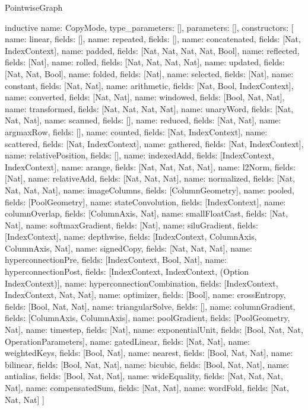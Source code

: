 \begin{lexlean}{PointwiseGraph}
\begin{semanticmodule}
inductive{
  name: CopyMode,
  type_parameters: [],
  parameters: [],
  constructors: [
    {name: linear, fields: []},
    {name: repeated, fields: []},
    {name: concatenated, fields: [Nat, IndexContext]},
    {name: padded, fields: [Nat, Nat, Nat, Nat, Bool]},
    {name: reflected, fields: [Nat]},
    {name: rolled, fields: [Nat, Nat, Nat, Nat]},
    {name: updated, fields: [Nat, Nat, Bool]},
    {name: folded, fields: [Nat]},
    {name: selected, fields: [Nat]},
    {name: constant, fields: [Nat, Nat]},
    {name: arithmetic, fields: [Nat, Bool, IndexContext]},
    {name: converted, fields: [Nat, Nat]},
    {name: windowed, fields: [Bool, Nat, Nat]},
    {name: transformed, fields: [Nat, Nat, Nat, Nat]},
    {name: unaryWord, fields: [Nat, Nat, Nat]},
    {name: scanned, fields: []},
    {name: reduced, fields: [Nat, Nat]},
    {name: argmaxRow, fields: []},
    {name: counted, fields: [Nat, IndexContext]},
    {name: scattered, fields: [Nat, IndexContext]},
    {name: gathered, fields: [Nat, IndexContext]},
    {name: relativePosition, fields: []},
    {name: indexedAdd, fields: [IndexContext, IndexContext]},
    {name: arange, fields: [Nat, Nat, Nat, Nat]},
    {name: l2Norm, fields: [Nat]},
    {name: relativeAdd, fields: [Nat, Nat, Nat]},
    {name: normalized, fields: [Nat, Nat, Nat, Nat]},
    {name: imageColumns, fields: [ColumnGeometry]},
    {name: pooled, fields: [PoolGeometry]},
    {name: stateConvolution, fields: [IndexContext]},
    {name: columnOverlap, fields: [ColumnAxis, Nat]},
    {name: smallFloatCast, fields: [Nat, Nat]},
    {name: softmaxGradient, fields: [Nat]},
    {name: siluGradient, fields: [IndexContext]},
    {name: depthwise, fields: [IndexContext, ColumnAxis, ColumnAxis, Nat]},
    {name: signedCopy, fields: [Nat, Nat, Nat]},
    {name: hyperconnectionPre, fields: [IndexContext, Bool, Nat]},
    {name: hyperconnectionPost, fields: [IndexContext, IndexContext, (Option IndexContext)]},
    {name: hyperconnectionCombination, fields: [IndexContext, IndexContext, Nat, Nat]},
    {name: optimizer, fields: [Bool]},
    {name: crossEntropy, fields: [Bool, Nat, Nat]},
    {name: triangularSolve, fields: []},
    {name: columnGradient, fields: [ColumnAxis, ColumnAxis]},
    {name: poolGradient, fields: [PoolGeometry, Nat]},
    {name: timestep, fields: [Nat]},
    {name: exponentialUnit, fields: [Bool, Nat, Nat, OperationParameters]},
    {name: gatedLinear, fields: [Nat, Nat]},
    {name: weightedKeys, fields: [Bool, Nat]},
    {name: nearest, fields: [Bool, Nat, Nat]},
    {name: bilinear, fields: [Bool, Nat, Nat]},
    {name: bicubic, fields: [Bool, Nat, Nat]},
    {name: antialias, fields: [Bool, Nat, Nat]},
    {name: wideEquality, fields: [Nat, Nat, Nat, Nat]},
    {name: compensatedSum, fields: [Nat, Nat]},
    {name: wordFold, fields: [Nat, Nat, Nat]}
  ]
}


\end{semanticmodule}
\end{lexlean}
